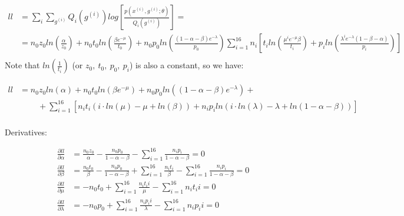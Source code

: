 \documentclass[]{article}
\begin{document}
$$
\begin{aligned}
  ll &= \sum_i \sum_{g^{(i)}}Q_i(g^{(i)}) log\left[ \frac{p(x^{(i)},g^{(i)};\theta)}{Q_i(g^{(i)})}\right] =\\
	 &= n_0 z_0 ln\left(   \frac{\alpha}{z_0} \right)+  n_0 t_0 ln\left(\frac{\beta  e^{-\mu}}{t_0}\right)  +n_0 p_0 ln\left( \frac{(1-\alpha - \beta) e^{-\lambda}}{p_0}  \right)   \sum _{i=1}^{16} n_i  \left[ t_i ln \left(\frac{ \mu^ie^{-\mu}  \beta}{t_i}\right)   +  p_i ln \left(\frac{ \lambda^i e^{-\lambda}(1-\beta-\alpha) }{p_i}\right)  \right]\\
\end{aligned}
$$
Note that $ln\left(\frac{1}{t_i}\right)$ (or $z_0,~t_0,~p_0,~p_i$) is also a constant, so we have:

$$
\begin{aligned}
  ll &= n_0 z_0 ln\left( \alpha \right)+  n_0 t_0 ln\left(\beta  e^{-\mu}\right)  +n_0 p_0 ln\left( (1-\alpha - \beta) e^{-\lambda} \right)  + \\
	 &~~~~~~~~~~+ \sum _{i=1}^{16} \left[ n_i  t_i \left(  i\cdot ln(\mu) - \mu + ln(\beta)  \right)   +  n_i p_i ln \left(  i\cdot ln(\lambda) - \lambda + ln(1-\alpha -\beta)  \right)  \right]\\
\end{aligned}
$$

Derivatives:

$$
\begin{aligned}
  \frac{\partial ll}{\partial \alpha} &= \frac{n_0z_0}{\alpha} -  \frac{n_0p_0}{1-\alpha-\beta} -  \sum_{i=1}^{16}\frac{n_ip_i}{1-\alpha-\beta}=0 \\
  \frac{\partial ll}{\partial \beta}  &= \frac{n_0t_0}{\beta} -  \frac{n_0p_0}{1-\alpha-\beta} + \sum_{i=1}^{16}\frac{n_it_i}{\beta} -  \sum_{i=1}^{16}\frac{n_ip_i}{1-\alpha-\beta}=0 \\
  \frac{\partial ll}{\partial \mu}    &= -n_0t_0 +  \sum_{i=1}^{16}\frac{n_i t_i i}{\mu} - \sum_{i=1}^{16}n_i t_i i =0\\
  \frac{\partial ll}{\partial \lambda}    &= -n_0p_0 +  \sum_{i=1}^{16}\frac{n_i p_i i}{\lambda} - \sum_{i=1}^{16}n_i p_i i =0 \\
\end{aligned}
$$
\end{document}
